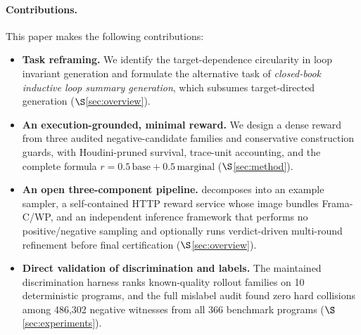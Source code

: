 \paragraph{Contributions.}
This paper makes the following contributions:
\begin{itemize}[leftmargin=1.5em, itemsep=2pt, topsep=2pt]
  \item \textbf{Task reframing.} We identify the target-dependence circularity in loop invariant generation and formulate the alternative task of \emph{closed-book inductive loop summary generation}, which subsumes target-directed generation ($\S$\ref{sec:overview}).
  \item \textbf{An execution-grounded, minimal reward.} We design a dense reward from three audited negative-candidate families and conservative construction guards, with Houdini-pruned survival, trace-unit accounting, and the complete formula $r=0.5\,\mathrm{base}+0.5\,\mathrm{marginal}$ ($\S$\ref{sec:method}).
  \item \textbf{An open three-component pipeline.} \sam{} decomposes into an example sampler, a self-contained HTTP reward service whose image bundles Frama-C/WP, and an independent inference framework that performs no positive/negative sampling and optionally runs verdict-driven multi-round refinement before final certification ($\S$\ref{sec:overview}).
  \item \textbf{Direct validation of discrimination and labels.} The maintained discrimination harness ranks known-quality rollout families on 10 deterministic programs, and the full mislabel audit found zero hard collisions among 486,302 negative witnesses from all 366 benchmark programs ($\S$\ref{sec:experiments}).
\end{itemize}
